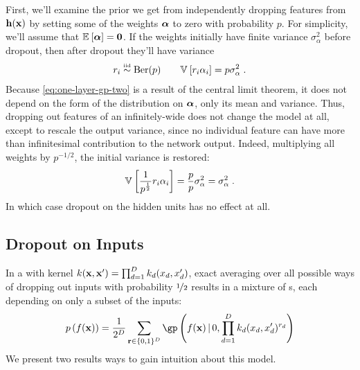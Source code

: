 First, we'll examine the prior we get from independently dropping features from ${\bf{h}}({\bf{x}})$ by setting some of the weights $\boldsymbol{\alpha}$ to zero with probability $p$.
For simplicity, we'll assume that $\mathbb{E}_{} \left[ {\boldsymbol{\alpha}} \right] = {\bf{0}}$.
If the weights initially have finite variance $\sigma^2_{\alpha}$ before dropout, then after dropout they'll have variance
\begin{align}
r_i \overset{\mbox{\tiny iid}}{\sim} \textnormal{Ber}(p)
\qquad
\mathbb{V}_{} \left[ {r_i \alpha_i} \right] = p \sigma_{\alpha}^2 \;.
\end{align}
Because \cref{eq:one-layer-gp-two} is a result of the central limit theorem, it does not depend on the form of the distribution on $\boldsymbol{\alpha}$, only its mean and variance.
Thus, dropping out features of an infinitely-wide \MLP{} does not change the model at all, except to rescale the output variance, since no individual feature can have more than infinitesimal contribution to the network output.
Indeed, multiplying all weights by $p^{-1/2}$, the initial variance is restored:
\begin{align}
\mathbb{V}_{} \left[ { \frac{1}{p^\frac{1}{2}} r_i \alpha_i} \right] = \frac{p}{p} \sigma_{\alpha}^2 = \sigma_{\alpha}^2 \;.
\end{align}
In which case dropout on the hidden units has no effect at all.



\subsection{Dropout on Inputs}

In a \gp{} with kernel ${k({\bf{x}}, {\bf{x}}') = \prod_{d=1}^D k_d(x_d, x_d')}$, exact averaging over all possible ways of dropping out inputs with probability $\nicefrac{1}{2}$ results in a mixture of \gp{}s, each depending on only a subset of the inputs:
\begin{align}
p \left( f(\vx) \right)
= \frac{1}{2^D} \sum_{\vr \in \{0,1\}^D}  \textnormal{\gp} \left(f(\vx) \given 0, \prod_{d=1}^D k_d(x_d, x_d')^{r_d} \right)
\label{eq:dropout-mixture}
\end{align}
We present two results ways to gain intuition about this model.

